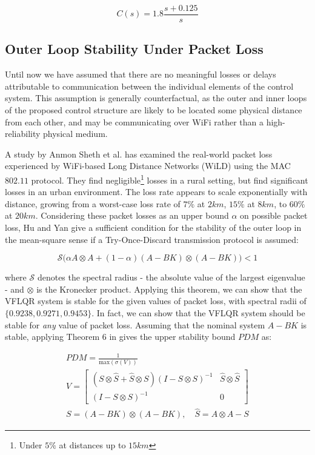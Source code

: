 \begin{equation}\label{eq:PIDTransferFunction}
	C(s) = 1.8\frac{s+0.125}{s}
\end{equation}

\subsection{Outer Loop Stability Under Packet Loss}\label{subsec:PacketLossStability}

Until now we have assumed that there are no meaningful losses or delays attributable to communication between the individual elements of the control system. This assumption is generally counterfactual, as the outer and inner loops of the proposed control structure are likely to be located some physical distance from each other, and may be communicating over WiFi rather than a high-reliability physical medium.

A study by Anmon Sheth et al. \cite{Sheth2007} has examined the real-world packet loss experienced by WiFi-based Long Distance Networks (WiLD) using the MAC $802.11$ protocol. They find negligible\footnote{Under $5\%$ at distances up to $15 \si{km}$} losses in a rural setting, but find significant losses in an urban environment. The loss rate appears to scale exponentially with distance, growing from a worst-case loss rate of $7\%$ at $2\si{km}$, $15\%$ at $8\si{km}$, to $60\%$ at $20\si{km}$. Considering these packet losses as an upper bound $\alpha$ on possible packet loss, Hu and Yan \cite{Hu2007} give a sufficient condition for the stability of the outer loop in the mean-square sense if a Try-Once-Discard transmission protocol is assumed:

\begin{equation}\label{eq:HuStabCondition}
	\mathcal{S}\Big(\alpha A \otimes A + (1-\alpha)(A-BK) \otimes (A-BK) \Big) < 1
\end{equation}

where $\mathcal{S}$ denotes the spectral radius - the absolute value of the largest eigenvalue - and $\otimes$ is the Kronecker product. Applying this theorem, we can show that the VFLQR system is stable for the given values of packet loss, with spectral radii of $\{0.9238,0.9271,0.9453\}$. In fact, we can show that the VFLQR system should be stable for \textit{any} value of packet loss. Assuming that the nominal system $A-BK$ is stable, applying Theorem 6 in \cite{Hu2007} gives the upper stability bound $PDM$ as: 

\begin{equation}\label{eq:VMatrix}
	\begin{gathered}
		PDM = \frac{1}{\text{max}(\sigma(V))} \\
		V = \begin{bmatrix} (S\otimes\hat{S}+\hat{S} \otimes S)(I - S\otimes S)^{-1} & \hat{S}\otimes\hat{S} \\ (I - S\otimes S)^{-1} & 0 \end{bmatrix} \\
		S = \left(A-BK\right) \otimes \left(A-BK\right), \quad \hat{S} = A \otimes A - S
	\end{gathered}
\end{equation}

